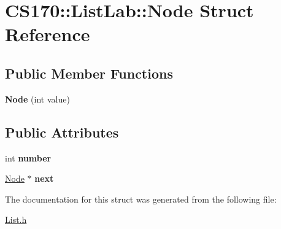 \hypertarget{struct_c_s170_1_1_list_lab_1_1_node}{\section{C\-S170\-:\-:List\-Lab\-:\-:Node Struct Reference}
\label{struct_c_s170_1_1_list_lab_1_1_node}
}
\subsection*{Public Member Functions}
\begin{DoxyCompactItemize}
\item 
\hypertarget{struct_c_s170_1_1_list_lab_1_1_node_a0f719377a31e31beed33195116232ac5}{{\bfseries Node} (int value)}\label{struct_c_s170_1_1_list_lab_1_1_node_a0f719377a31e31beed33195116232ac5}

\end{DoxyCompactItemize}
\subsection*{Public Attributes}
\begin{DoxyCompactItemize}
\item 
\hypertarget{struct_c_s170_1_1_list_lab_1_1_node_a47d68bf6dcda11fb33cbae1e11ad82a0}{int {\bfseries number}}\label{struct_c_s170_1_1_list_lab_1_1_node_a47d68bf6dcda11fb33cbae1e11ad82a0}

\item 
\hypertarget{struct_c_s170_1_1_list_lab_1_1_node_a696b86640701eb95456b6a23b1e61464}{\hyperlink{struct_c_s170_1_1_list_lab_1_1_node}{Node} $\ast$ {\bfseries next}}\label{struct_c_s170_1_1_list_lab_1_1_node_a696b86640701eb95456b6a23b1e61464}

\end{DoxyCompactItemize}


The documentation for this struct was generated from the following file\-:\begin{DoxyCompactItemize}
\item 
\hyperlink{_list_8h}{List.\-h}\end{DoxyCompactItemize}
